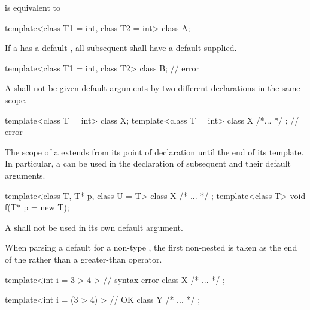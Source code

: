 is equivalent to

\begin{codeblock}
template<class T1 = int, class T2 = int> class A;
\end{codeblock}
\exitexampleb

\pnum
If a
has a default
,
all subsequent
shall have a default
supplied.
\enterexample

\begin{codeblock}
template<class T1 = int, class T2> class B;   // error
\end{codeblock}
\exitexampleb

\pnum
A
shall
not be given default arguments by two different declarations in the same scope.
\enterexample

\begin{codeblock}
template<class T = int> class X;
template<class T = int> class X { /*... */ }; // error
\end{codeblock}
\exitexampleb

\pnum
The scope of a  extends from its point of
declaration until the end of its template. In particular, a
 can be used in the declaration of
subsequent  and their default arguments.
\enterexample

\begin{codeblock}
template<class T, T* p, class U = T> class X { /* ... */ };
template<class T> void f(T* p = new T);
\end{codeblock}

\exitexampleb

\pnum
A  shall not be used in its own default
argument.

%
\pnum
When parsing a default
for a non-type
,
the first non-nested
\tcode{>}
is taken as the end of the
rather than a greater-than operator.
\enterexample

\begin{codeblock}
template<int i = 3 > 4 >        // syntax error
  class X { /* ... */ };

template<int i = (3 > 4) >      // OK
  class Y { /* ... */ };
\end{codeblock}
\exitexampleb

